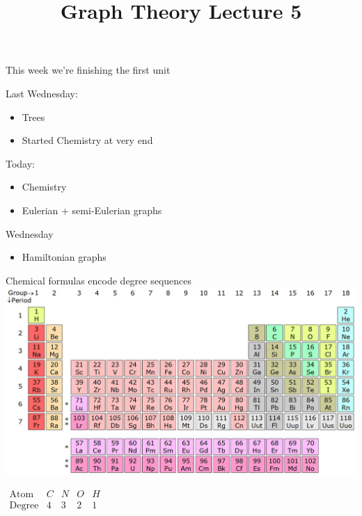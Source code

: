 \documentclass{beamer}
\title{Graph Theory Lecture 5}
\begin{document}
\begin{frame}{This week we're finishing the first unit}
  \begin{block}{Last Wednesday:}
    \begin{itemize}
    \item Trees
    \item Started Chemistry at very end
    \end{itemize}
    \end{block}
    \begin{block}{Today:}
      \begin{itemize}
      \item Chemistry
      \item Eulerian + semi-Eulerian graphs
      \end{itemize}
    \end{block}

    \begin{block}{Wednesday}
      \begin{itemize}
      \item Hamiltonian graphs
      \end{itemize}
      \end{block}
 

\end{frame}


\begin{frame}{Chemical formulas encode degree sequences}
\includegraphics[width=\textwidth]{Pictures/periodictablebig.jpg}
\begin{center} $\begin{array}{c|cccc}
  \text{Atom} & C & N & O & H \\ \hline 
  \text{Degree} & 4 & 3 & 2 & 1
  \end{array}$ \end{center}
\end{frame}
\end{document}
